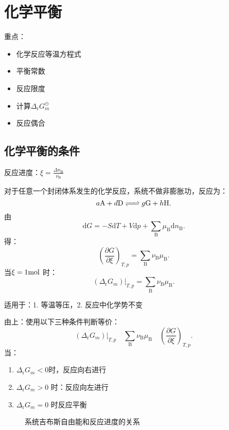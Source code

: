 \section{化学平衡}%
\label{sec:化学平衡}
重点：
\begin{itemize}
    \item 化学反应等温方程式
    \item 平衡常数
    \item 反应限度
    \item 计算$\Delta_\text{r}G_{m}^\ominus $
    \item 反应偶合
\end{itemize}
\subsection{化学平衡的条件}%
\label{sub:化学平衡的条件}
\begin{defi}
    反应进度：$\xi = \frac{\Delta n_\text{B}}{\nu_\text{B}}$
\end{defi}
对于任意一个封闭体系发生的化学反应，系统不做非膨胀功，反应为：\[
    a\ce{A}+d \ce{D}\ce{<=>[][]}g\ce{G}+h\ce{H}
.\]
由\[\boxed{
    \mathrm{d}G = -S\mathrm{d}T + V\mathrm{d}p + \sum_{\text{B}}\mu_\text{B}\mathrm{d}n_\text{B}
.}\]
得：\[
    \left(\frac{\partial G}{\partial \xi}\right)_{T,p} = \sum_{\text{B}}\nu_\text{B}\mu_\text{B}
.\]
当$\xi=1\ce{mol}$ 时：
\[
    \left( \Delta_\text{r}G_{m}  \right)\left.\right|_{T,p}^{} = \sum_{\text{B}}\nu_\text{B}\mu_\text{B}
.\]
\begin{notation}
    适用于：1. 等温等压，2. 反应中化学势不变
\end{notation}
\begin{notation}
    由上：使用以下三种条件判断等价：
    \[
        \left.\left( \Delta_\text{r}G_{m} \right)\right|_{T,p}^{}\quad \sum_{\text{B}}\nu_\text{B}\mu_\text{B} \quad \left(\frac{\partial G}{\partial \xi}\right)_{T,p}
    .\]
    当：
    \begin{enumerate}
        \item $\Delta_\text{r}G_{m} <0$时，反应向右进行
        \item $\Delta_\text{r}G_{m} >0$ 时：反应向左进行
        \item $\Delta_\text{r}G_{m} =0$ 时反应平衡
    \end{enumerate}
\end{notation}
\begin{figure}[ht!]
    \centering
    \caption{系统吉布斯自由能和反应进度的关系}
    \label{fig:系统吉布斯自由能和反应进度的关系}
\end{figure}
